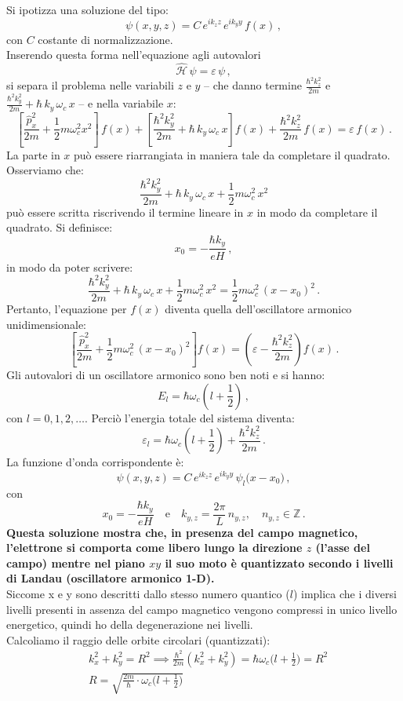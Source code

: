 Si ipotizza una soluzione del tipo:
\[
\psi(x,y,z)= C\,e^{ik_z z}\, e^{ik_y y}\, f(x)\,,
\]
con \(C\) costante di normalizzazione.  \\
Inserendo questa forma nell'equazione agli autovalori
\[
\hat{\mathcal{H}}\,\psi = \varepsilon\, \psi\,,
\]
si separa il problema nelle variabili \(z\) e \(y\) – che danno termine \(\frac{\hbar^2 k_z^2}{2m}\) e \(\frac{\hbar^2 k_y^2}{2m}+\hbar\,k_y\,\omega_c\,x\) – e nella variabile \(x\):
\[
\left[\frac{\hat{p}_x^2}{2m}+ \frac{1}{2}m\omega_c^2 x^2\right]\,f(x) + \left[\frac{\hbar^2 k_y^2}{2m}+ \hbar\,k_y\,\omega_c\,x\right]f(x) + \frac{\hbar^2 k_z^2}{2m}\, f(x) = \varepsilon\, f(x)\,.
\]
La parte in \(x\) può essere riarrangiata in maniera tale da completare il quadrato.  \\
Osserviamo che:
\[
\frac{\hbar^2 k_y^2}{2m} + \hbar\,k_y\,\omega_c\, x + \frac{1}{2}m\omega_c^2\, x^2
\]
può essere scritta riscrivendo il termine lineare in \(x\) in modo da completare il quadrato.  
Si definisce:
\[
x_0 = -\frac{\hbar k_y}{eH}\,,
\]
in modo da poter scrivere:
\[
\frac{\hbar^2 k_y^2}{2m} + \hbar\,k_y\,\omega_c\, x + \frac{1}{2}m\omega_c^2\, x^2 = \frac{1}{2}m\omega_c^2\,(x-x_0)^2\,.
\]
Pertanto, l'equazione per \(f(x)\) diventa quella dell'oscillatore armonico unidimensionale:
\[
\left[\frac{\hat{p}_x^2}{2m} + \frac{1}{2}m\omega_c^2\,(x-x_0)^2\right] f(x) = \left(\varepsilon - \frac{\hbar^2 k_z^2}{2m}\right) f(x)\,.
\]
Gli autovalori di un oscillatore armonico sono ben noti e si hanno:
\[
E_l = \hbar\omega_c\left(l+\frac{1}{2}\right)\,,
\]
con \(l=0,1,2,\ldots\).  
Perciò l'energia totale del sistema diventa:
\[
\varepsilon_l= \hbar\omega_c\left(l+\frac{1}{2}\right) + \frac{\hbar^2 k_z^2}{2m}\,.
\]
La funzione d'onda corrispondente è:
\[
\psi(x,y,z) = C\, e^{ik_z z}\, e^{ik_y y}\, \psi_l\bigl(x-x_0\bigr)\,,
\]
con
\[
x_0 = -\frac{\hbar k_y}{eH} \quad \text{e} \quad k_{y,z} = \frac{2\pi}{L}\, n_{y,z}, \quad n_{y,z} \in \mathbb{Z}\,.
\]
\textbf{Questa soluzione mostra che, in presenza del campo magnetico, l'elettrone si comporta come libero lungo la direzione \(z\) (l'asse del campo) mentre nel piano \(xy\) il suo moto è quantizzato secondo i livelli di Landau (oscillatore armonico 1-D).}  \\
Siccome x e y sono descritti dallo stesso numero quantico ($l$) implica che i diversi livelli presenti in assenza del campo magnetico vengono compressi in unico livello energetico, quindi ho della degenerazione nei livelli. \\
Calcoliamo il raggio delle orbite circolari (quantizzati):\\
\begin{equation}
    \begin{split}
        &k_x^2+k_y^2=R^2 \implies \frac{\hbar^2}{2m}(k_x^2+k_y^2)=\hbar\omega_c\biggr(l+\frac{1}{2}\biggr) = R^2\\
        &R = \sqrt{\frac{2m}{\hbar}\cdot \omega_c\biggr(l+\frac{1}{2}\biggr)}
    \end{split}
\end{equation}

